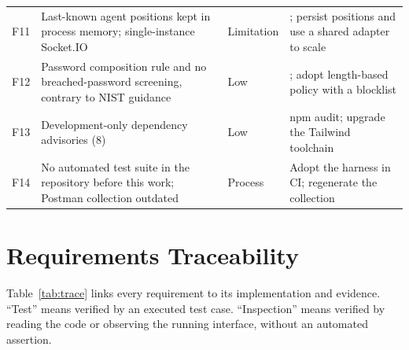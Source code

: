 \begin{longtable}{@{}P{0.7cm}P{5.6cm}P{1.7cm}P{5.4cm}@{}}
F11 & Last-known agent positions kept in process memory; single-instance Socket.IO & Limitation & ; persist positions and use a shared adapter to scale \\
F12 & Password composition rule and no breached-password screening, contrary to NIST guidance & Low & ; adopt length-based policy with a blocklist \cite{nist80063b} \\
F13 & Development-only dependency advisories (8) & Low & npm audit; upgrade the Tailwind toolchain \\
F14 & No automated test suite in the repository before this work; Postman collection outdated & Process & Adopt the harness in CI; regenerate the collection \\
\bottomrule
\end{longtable}

\section{Requirements Traceability}
\label{sec:traceability}

Table~\ref{tab:trace} links every requirement to its implementation and evidence. ``Test'' means verified by an executed test case. ``Inspection'' means verified by reading the code or observing the running interface, without an automated assertion.

